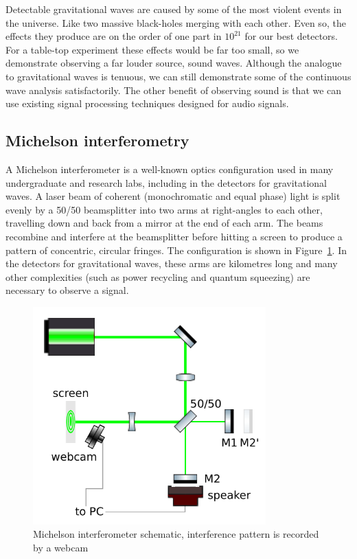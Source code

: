 \documentclass[prb,preprint]{revtex4-1}
\begin{document}
Detectable gravitational waves are caused by some of the most violent events in the universe. Like two massive black-holes merging with each other\cite{GW150914}. Even so, the effects they produce are on the order of one part in $10^{21}$ for our best detectors\cite{GW150914}. For a table-top experiment these effects would be far too small, so we demonstrate observing a far louder source, sound waves. Although the analogue to gravitational waves is tenuous, we can still demonstrate some of the continuous wave analysis satisfactorily. The other benefit of observing sound is that we can use existing signal processing techniques designed for audio signals.

\subsection{Michelson interferometry}

A Michelson interferometer is a well-known optics configuration used in many undergraduate and research labs, including in the detectors for gravitational waves. A laser beam of coherent (monochromatic and equal phase) light is split evenly by a 50/50 beamsplitter into two arms at right-angles to each other, travelling down and back from a mirror at the end of each arm. The beams recombine and interfere at the beamsplitter before hitting a screen to produce a pattern of concentric, circular fringes. The configuration is shown in Figure~\ref{fig:ifo_schematic_webcam}. In the detectors for gravitational waves, these arms are kilometres long and many other complexities (such as power recycling and quantum squeezing)\cite{GW150914} are necessary to observe a signal.

\begin{figure}
	\includegraphics[width=0.8\textwidth]{figures/ifo_schematic_webcam.pdf}
	\caption{Michelson interferometer schematic, interference pattern is recorded by a webcam}
	\label{fig:ifo_schematic_webcam}
\end{figure}
\end{document}
